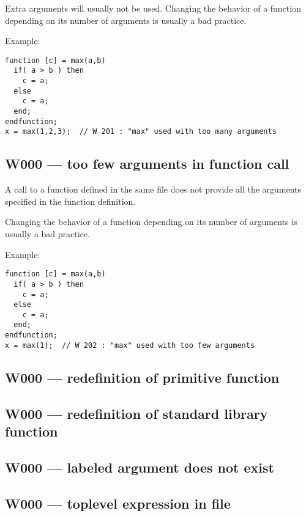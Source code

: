 Extra arguments will usually not be used. Changing the behavior of a
function depending on its number of arguments is usually a bad
practice.



Example:\begin{verbatim}
function [c] = max(a,b)
  if( a > b ) then
    c = a;
  else
    c = a;
  end;
endfunction;
x = max(1,2,3);  // W 201 : "max" used with too many arguments
\end{verbatim}




\subsection{W000 --- too few arguments in function call }




A call to a function defined in the same file does not provide all the
arguments specified in the function definition.



Changing the behavior of a function depending on its number of
arguments is usually a bad practice.



Example:\begin{verbatim}
function [c] = max(a,b)
  if( a > b ) then
    c = a;
  else
    c = a;
  end;
endfunction;
x = max(1);  // W 202 : "max" used with too few arguments
\end{verbatim}




\subsection{W000 --- redefinition of primitive function}




\subsection{W000 --- redefinition of standard library function}




\subsection{W000 --- labeled argument does not exist}




\subsection{W000 --- toplevel expression in file}




